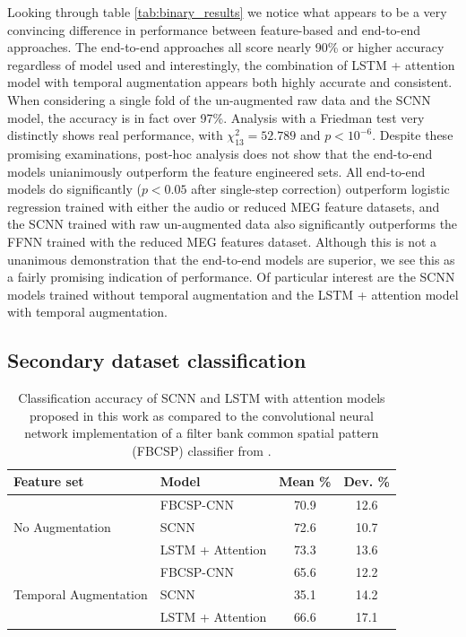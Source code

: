 \documentclass[utf8]{frontiersSCNS} %
\begin{document}
Looking through table \ref{tab:binary_results} we notice what appears to be a very convincing difference in performance between feature-based and end-to-end approaches. The end-to-end approaches all score nearly 90\% or higher accuracy regardless of model used and interestingly, the combination of LSTM + attention model with temporal augmentation appears both highly accurate and consistent. When considering a single fold of the un-augmented raw data and the SCNN model, the accuracy is in fact over 97\%. Analysis with a Friedman test very distinctly shows real performance, with $\chi^2_{13}=52.789$ and $p<10^{-6}$. Despite these promising examinations, post-hoc analysis does not show that the end-to-end models unianimously outperform the feature engineered sets. All end-to-end models do significantly ($p<0.05$ after single-step correction) outperform logistic regression trained with either the audio or reduced MEG feature datasets, and the SCNN trained with raw un-augmented data also significantly outperforms the FFNN trained with the reduced MEG features dataset. Although this is not a unanimous demonstration that the end-to-end models are superior, we see this as a fairly promising indication of performance. Of particular interest are the SCNN models trained without temporal augmentation and the LSTM + attention model with temporal augmentation.

\subsection{Secondary dataset classification}

\begin{table}[t]
  \caption{Classification accuracy of SCNN and LSTM with attention models proposed in this work as compared to the convolutional neural network implementation of a filter bank common spatial pattern (FBCSP) classifier from \cite{Schirrmeister2017}.}
  \centering
  \begin{tabular}{l l | c | c}
    \toprule
    \textbf{Feature set} & \textbf{Model} & \textbf{Mean \%} & \textbf{Dev. \%} \\
    \toprule
    \multirow{3}{*}{No Augmentation}
                         & FBCSP-CNN           & 70.9 & 12.6  \\
                         & SCNN                & 72.6 & 10.7  \\
                         & LSTM + Attention    & 73.3 & 13.6  \\ 
    \midrule
    \multirow{3}{*}{Temporal Augmentation}
                         & FBCSP-CNN           & 65.6 & 12.2  \\
                         & SCNN                & 35.1 & 14.2  \\
                         & LSTM + Attention    & 66.6 & 17.1  \\ 
    \bottomrule
  \end{tabular}
  \label{tab:sec_results}
\end{table}
\end{document}
